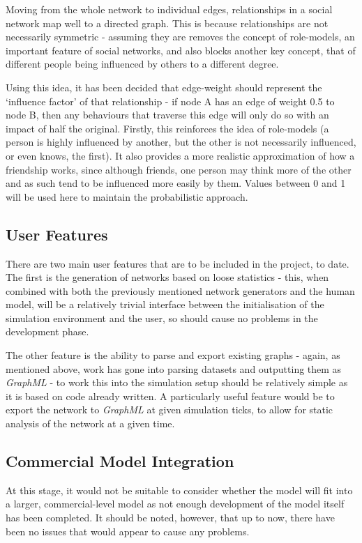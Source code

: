 \documentclass[]{article}
\begin{document}
Moving from the whole network to individual edges, relationships in a social network map well to a directed graph. This is because relationships are not necessarily symmetric - assuming they are removes the concept of role-models, an important feature of social networks, and also blocks another key concept,  that of different people being influenced by others to a different degree. 

Using this idea, it has been decided that edge-weight should represent the `influence factor' of that relationship - if node A has an edge of weight 0.5 to node B, then any behaviours that traverse this edge will only do so with an impact of half the original. Firstly, this reinforces the idea of role-models (a person is highly influenced by another, but the other is not necessarily influenced, or even knows, the first). It also provides a more realistic approximation of how a friendship works, since although friends, one person may think more of the other and as such tend to be influenced more easily by them. Values between 0 and 1 will be used here to maintain the probabilistic approach.

\subsection{User Features}

There are two main user features that are to be included in the project, to date. The first is the generation of networks based on loose statistics - this, when combined with both the previously mentioned network generators and the human model, will be a relatively trivial interface between the initialisation of the simulation environment and the user, so should cause no problems in the development phase. 

The other feature is the ability to parse and export existing graphs - again, as mentioned above, work has gone into parsing datasets and outputting them as \emph{GraphML} - to work this into the simulation setup should be relatively simple as it is based on code already written. A particularly useful feature would be to export the network to \emph{GraphML} at given simulation ticks, to allow for static analysis of the network at a given time. 

\subsection{Commercial Model Integration}

At this stage, it would not be suitable to consider whether the model will fit into a larger, commercial-level model as not enough development of the model itself has been completed. It should be noted, however, that up to now, there have been no issues that would appear to cause any problems. 
\end{document}
